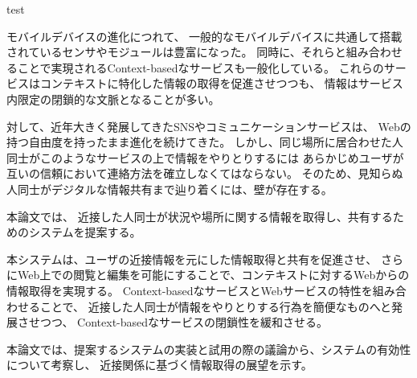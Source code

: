 test


\begin{jabstract}

モバイルデバイスの進化につれて、
一般的なモバイルデバイスに共通して搭載されているセンサやモジュールは豊富になった。
同時に、それらと組み合わせることで実現されるContext-basedなサービスも一般化している。
これらのサービスはコンテキストに特化した情報の取得を促進させつつも、
情報はサービス内限定の閉鎖的な文脈となることが多い。

対して、近年大きく発展してきたSNSやコミュニケーションサービスは、
Webの持つ自由度を持ったまま進化を続けてきた。
しかし、同じ場所に居合わせた人同士がこのようなサービスの上で情報をやりとりするには
あらかじめユーザが互いの信頼において連絡方法を確立しなくてはならない。
そのため、見知らぬ人同士がデジタルな情報共有まで辿り着くには、壁が存在する。

本論文では、
近接した人同士が状況や場所に関する情報を取得し、共有するためのシステムを提案する。

本システムは、ユーザの近接情報を元にした情報取得と共有を促進させ、
さらにWeb上での閲覧と編集を可能にすることで、コンテキストに対するWebからの情報取得を実現する。
Context-basedなサービスとWebサービスの特性を組み合わせることで、
近接した人同士が情報をやりとりする行為を簡便なものへと発展させつつ、
Context-basedなサービスの閉鎖性を緩和させる。

本論文では、提案するシステムの実装と試用の際の議論から、システムの有効性について考察し、
近接関係に基づく情報取得の展望を示す。


\end{jabstract}



